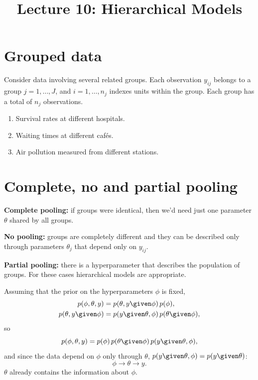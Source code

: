 
\title{Lecture 10: Hierarchical Models}
\author{}\date{}

\usetikzlibrary{fit}


\maketitle

\section{Grouped data}
Consider data involving several related groups. Each observation $y_{ij}$ belongs to a group $j = 1, \dots, J$, and $i = 1, \dots, n_j$ indexes units within the group. Each group has a total of $n_j$ observations.

\begin{example}
\leavevmode
\begin{enumerate}[label=\arabic*.)]
  \item Survival rates at different hospitals.
  \item Waiting times at different caf\'es.
  \item Air pollution measured from different stations.
\end{enumerate}
\end{example}

\section{Complete, no and partial pooling}
\textbf{Complete pooling:} if groups were identical, then we'd need just one parameter $\theta$ shared by all groups.

\textbf{No pooling:} groups are completely different and they can be described only through parameters $\theta_j$ that depend only on $y_{ij}$.

\textbf{Partial pooling:} there is a hyperparameter that describes the population of groups. For these cases hierarchical models are appropriate.

Assuming that the prior on the hyperparameters $\phi$ is fixed,
\begin{align*}
p(\phi, \theta, y) &= p(\theta, y \given \phi)\,p(\phi), \\
p(\theta, y \given \phi) &= p(y \given \theta, \phi)\,p(\theta \given \phi),
\end{align*}
so
\[
p(\phi, \theta, y) = p(\phi)\,p(\theta \given \phi)\,p(y \given \theta, \phi),
\]
and since the data depend on $\phi$ only through $\theta$, $p(y \given \theta, \phi) = p(y \given \theta)$:
\[
\phi \longrightarrow \theta \longrightarrow y.
\]
$\theta$ already contains the information about $\phi$.

